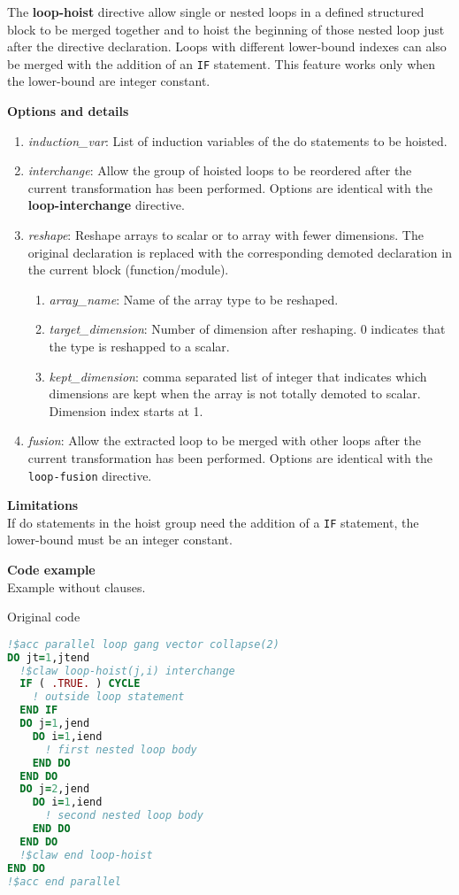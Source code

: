 The \textbf{loop-hoist} directive allow single or nested loops in a defined
structured block to be merged together and to hoist the beginning of those
nested loop just after the directive declaration. Loops with different
lower-bound indexes can also be merged with the addition of an \lstinline!IF!
statement. This feature works only when the lower-bound are integer constant.


\textbf{Options and details}
\begin{enumerate}
\item \textit{induction\_var}: List of induction variables of the do statements
to be hoisted.
\item \textit{interchange}: Allow the group of hoisted loops to be reordered
after the current transformation has been performed.
Options are identical with the \textbf{loop-interchange} directive.
\item \textit{reshape}: Reshape arrays to scalar or to array with fewer
dimensions. The original declaration is replaced with the corresponding demoted
declaration in the current block (function/module).
\begin{enumerate}
  \item \textit{array\_name}: Name of the array type to be reshaped.
  \item \textit{target\_dimension}: Number of dimension after reshaping. 0
  indicates that the type is reshapped to a scalar.
  \item \textit{kept\_dimension}: comma separated list of integer that indicates
  which dimensions are kept when the array is not totally demoted to scalar.
  Dimension index starts at 1.
\end{enumerate}
\item \textit{fusion}: Allow the extracted loop to be merged with other loops
after the current transformation has been performed.
Options are identical with the \lstinline!loop-fusion! directive.
\end{enumerate}

\textbf{Limitations}\\
If do statements in the hoist group need the addition of a \lstinline|IF|
statement, the lower-bound must be an integer constant.

\textbf{Code example}\\
\label{loop-hoist1}
Example without clauses.

Original code
\begin{lstlisting}[language=Fortran]
!$acc parallel loop gang vector collapse(2)
DO jt=1,jtend
  !$claw loop-hoist(j,i) interchange
  IF ( .TRUE. ) CYCLE
    ! outside loop statement
  END IF
  DO j=1,jend
    DO i=1,iend
      ! first nested loop body
    END DO
  END DO
  DO j=2,jend
    DO i=1,iend
      ! second nested loop body
    END DO
  END DO
  !$claw end loop-hoist
END DO
!$acc end parallel
\end{lstlisting}


